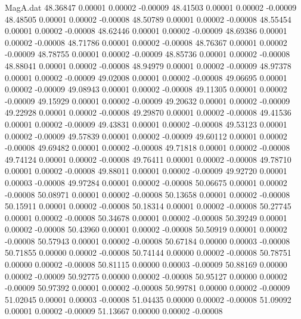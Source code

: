 \begin{filecontents}{MagA.dat}
  48.36847    0.00001    0.00002   -0.00009
  48.41503    0.00001    0.00002   -0.00009
  48.48505    0.00001    0.00002   -0.00008
  48.50789    0.00001    0.00002   -0.00008
  48.55454    0.00001    0.00002   -0.00008
  48.62446    0.00001    0.00002   -0.00009
  48.69386    0.00001    0.00002   -0.00008
  48.71786    0.00001    0.00002   -0.00008
  48.76367    0.00001    0.00002   -0.00009
  48.78755    0.00001    0.00002   -0.00009
  48.85736    0.00001    0.00002   -0.00008
  48.88041    0.00001    0.00002   -0.00008
  48.94979    0.00001    0.00002   -0.00009
  48.97378    0.00001    0.00002   -0.00009
  49.02008    0.00001    0.00002   -0.00008
  49.06695    0.00001    0.00002   -0.00009
  49.08943    0.00001    0.00002   -0.00008
  49.11305    0.00001    0.00002   -0.00009
  49.15929    0.00001    0.00002   -0.00009
  49.20632    0.00001    0.00002   -0.00009
  49.22928    0.00001    0.00002   -0.00008
  49.29870    0.00001    0.00002   -0.00008
  49.41536    0.00001    0.00002   -0.00009
  49.43831    0.00001    0.00002   -0.00008
  49.53123    0.00001    0.00002   -0.00009
  49.57839    0.00001    0.00002   -0.00009
  49.60112    0.00001    0.00002   -0.00008
  49.69482    0.00001    0.00002   -0.00008
  49.71818    0.00001    0.00002   -0.00008
  49.74124    0.00001    0.00002   -0.00008
  49.76411    0.00001    0.00002   -0.00008
  49.78710    0.00001    0.00002   -0.00008
  49.88011    0.00001    0.00002   -0.00009
  49.92720    0.00001    0.00003   -0.00008
  49.97284    0.00001    0.00002   -0.00008
  50.06675    0.00001    0.00002   -0.00008
  50.08971    0.00001    0.00002   -0.00008
  50.13658    0.00001    0.00002   -0.00008
  50.15911    0.00001    0.00002   -0.00008
  50.18314    0.00001    0.00002   -0.00008
  50.27745    0.00001    0.00002   -0.00008
  50.34678    0.00001    0.00002   -0.00008
  50.39249    0.00001    0.00002   -0.00008
  50.43960    0.00001    0.00002   -0.00008
  50.50919    0.00001    0.00002   -0.00008
  50.57943    0.00001    0.00002   -0.00008
  50.67184    0.00000    0.00003   -0.00008
  50.71855    0.00000    0.00002   -0.00008
  50.74144    0.00000    0.00002   -0.00008
  50.78751    0.00000    0.00002   -0.00008
  50.81115    0.00000    0.00003   -0.00009
  50.88169    0.00000    0.00002   -0.00009
  50.92775    0.00000    0.00002   -0.00008
  50.95127    0.00000    0.00002   -0.00009
  50.97392    0.00001    0.00002   -0.00008
  50.99781    0.00000    0.00002   -0.00009
  51.02045    0.00001    0.00003   -0.00008
  51.04435    0.00000    0.00002   -0.00008
  51.09092    0.00001    0.00002   -0.00009
  51.13667    0.00000    0.00002   -0.00008

\end{filecontents}
